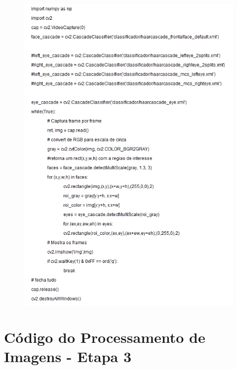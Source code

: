 \begin{apendicesenv}
\begin{figure}[H]
		\centering
			\includegraphics[scale=1.0]{figuras/img2.png}
		\label{img2}
\end{figure}

\chapter{Código do Processamento de Imagens - Etapa 3}


\end{apendicesenv}
